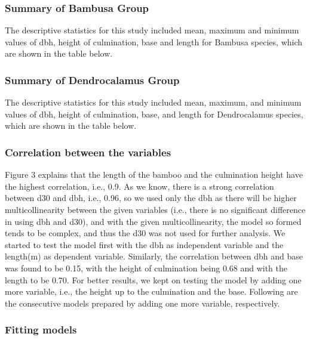 \documentclass[preprint, 3p,
authoryear]{elsarticle} %
\begin{document}
\hypertarget{summary-of-bambusa-group}{%
\subsubsection{Summary of Bambusa
Group}\label{summary-of-bambusa-group}}

The descriptive statistics for this study included mean, maximum and
minimum values of dbh, height of culmination, base and length for
Bambusa species, which are shown in the table below.

\hypertarget{summary-of-dendrocalamus-group}{%
\subsubsection{Summary of Dendrocalamus
Group}\label{summary-of-dendrocalamus-group}}

The descriptive statistics for this study included mean, maximum, and
minimum values of dbh, height of culmination, base, and length for
Dendrocalamus species, which are shown in the table below.

\hypertarget{correlation-between-the-variables}{%
\subsubsection{Correlation between the
variables}\label{correlation-between-the-variables}}

Figure 3 explains that the length of the bamboo and the culmination
height have the highest correlation, i.e., 0.9. As we know, there is a
strong correlation between d30 and dbh, i.e., 0.96, so we used only the
dbh as there will be higher multicollinearity between the given
variables (i.e., there is no significant difference in using dbh and
d30), and with the given multicollinearity, the model so formed tends to
be complex, and thus the d30 was not used for further analysis. We
started to test the model first with the dbh as independent variable and
the length(m) as dependent variable. Similarly, the correlation between
dbh and base was found to be 0.15, with the height of culmination being
0.68 and with the length to be 0.70. For better results, we kept on
testing the model by adding one more variable, i.e., the height up to
the culmination and the base. Following are the consecutive models
prepared by adding one more variable, respectively.

\hypertarget{fitting-models}{%
\subsubsection{Fitting models}\label{fitting-models}}
\end{document}
